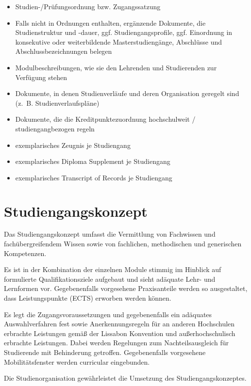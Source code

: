 \begin{itemize}
\item
  Studien-/Prüfungsordnung bzw. Zugangssatzung
\item
  Falls nicht in Ordnungen enthalten, ergänzende Dokumente, die
  Studienstruktur und -dauer, ggf. Studiengangsprofile, ggf. Einordnung
  in konsekutive oder weiterbildende Masterstudiengänge, Abschlüsse und
  Abschlussbezeichnungen belegen
\item
  Modulbeschreibungen, wie sie den Lehrenden und Studierenden zur
  Verfügung stehen
\item
  Dokumente, in denen Studienverläufe und deren Organisation geregelt
  sind (z.~B. Studienverlaufspläne)
\item
  Dokumente, die die Kreditpunktezuordnung hochschulweit /
  studiengangbezogen regeln
\item
  exemplarisches Zeugnis je Studiengang
\item
  exemplarisches Diploma Supplement je Studiengang
\item
  exemplarisches Transcript of Records je Studiengang
\end{itemize}

%

\chapter{Studiengangskonzept}\label{Studiengangskonzept}


Das Studiengangskonzept umfasst die Vermittlung von Fachwissen und
fachübergreifendem Wissen sowie von fachlichen, methodischen und
generischen Kompetenzen.

Es ist in der Kombination der einzelnen Module stimmig im Hinblick auf
formulierte Qualifikationsziele aufgebaut und sieht adäquate Lehr- und
Lernformen vor. Gegebenenfalls vorgesehene Praxisanteile werden so
ausgestaltet, dass Leistungspunkte (ECTS) erworben werden können.

Es legt die Zugangsvoraussetzungen und gegebenenfalls ein adäquates
Auswahlverfahren fest sowie Anerkennungsregeln für an anderen
Hochschulen erbrachte Leistungen gemäß der Lissabon Konvention und
außerhochschulisch erbrachte Leistungen. Dabei werden Regelungen zum
Nachteilsausgleich für Studierende mit Behinderung getroffen.
Gegebenenfalls vorgesehene Mobilitätsfenster werden curricular
eingebunden.

Die Studienorganisation gewährleistet die Umsetzung des
Studiengangskonzeptes.

